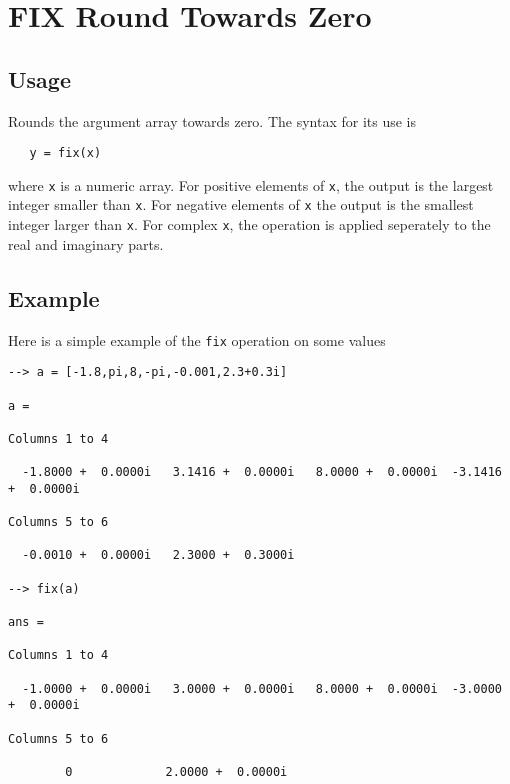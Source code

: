 \section{FIX Round Towards Zero}

\subsection{Usage}

Rounds the argument array towards zero.  The syntax for its use is
\begin{verbatim}
   y = fix(x)
\end{verbatim}
where \verb|x| is a numeric array.  For positive elements of \verb|x|, the output
is the largest integer smaller than \verb|x|.  For negative elements of \verb|x|
the output is the smallest integer larger than \verb|x|.  For complex \verb|x|,
the operation is applied seperately to the real and imaginary parts.
\subsection{Example}

Here is a simple example of the \verb|fix| operation on some values
\begin{verbatim}
--> a = [-1.8,pi,8,-pi,-0.001,2.3+0.3i]

a = 
 
Columns 1 to 4

  -1.8000 +  0.0000i   3.1416 +  0.0000i   8.0000 +  0.0000i  -3.1416 +  0.0000i 
 
Columns 5 to 6

  -0.0010 +  0.0000i   2.3000 +  0.3000i 

--> fix(a)

ans = 
 
Columns 1 to 4

  -1.0000 +  0.0000i   3.0000 +  0.0000i   8.0000 +  0.0000i  -3.0000 +  0.0000i 
 
Columns 5 to 6

        0             2.0000 +  0.0000i 
\end{verbatim}

